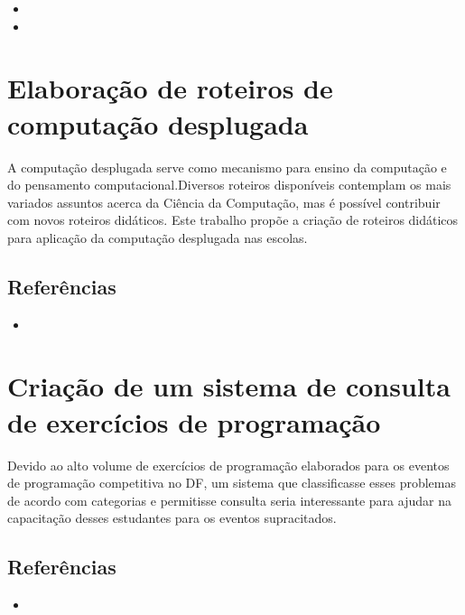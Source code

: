 \documentclass{article}
\newcommand*{\nsection}[1]{
    \section{#1}
}
\begin{document}
\begin{itemize}
	\item {}
	\item {}
\end{itemize}


\nsection{Elaboração de roteiros de computação desplugada}

A computação desplugada serve como mecanismo para ensino da computação e do pensamento computacional.Diversos roteiros disponíveis contemplam os mais variados assuntos acerca da Ciência da Computação, mas é possível contribuir com novos roteiros didáticos. Este trabalho propõe a criação de roteiros didáticos para aplicação da computação desplugada nas escolas.

\subsection{Referências}

\begin{itemize}
	\item {}
\end{itemize}


\nsection{Criação de um sistema de consulta de exercícios de programação}

Devido ao alto volume de exercícios de programação elaborados para os eventos de programação competitiva no DF, um sistema que classificasse esses problemas de acordo com categorias e permitisse consulta seria interessante para ajudar na capacitação desses estudantes para os eventos supracitados.

\subsection{Referências}

\begin{itemize}
	\item {}
\end{itemize}
\end{document}
